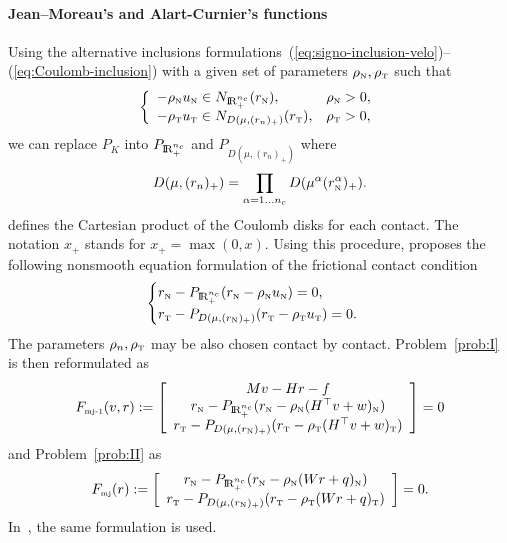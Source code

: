 \paragraph{Jean--Moreau's and Alart-Curnier's functions}

Using the alternative inclusions formulations~(\ref{eq:signo-inclusion-velo})--(\ref{eq:Coulomb-inclusion}) with a given set of parameters $\rho_{\hbox{\tiny{N}}},\rho_{\hbox{\tiny{T}}}$ such that
\begin{equation} 
  \label{eq:inclusion-rhorho}
  \left\{ \begin{array}{ll}
    -\rho_\n u_\n \in N_{\RR^{n_c}_+}(r_\n), & \rho_\n>0, \\
    -\rho_\t u_{\t} \in N_{D(\mu,(r_{n})_+)}(r_\t), & \rho_\t>0,
  \end{array}\right.
\end{equation}
 we can replace $P_K$ into $P_{\mathrm{I\!R}^{n_c}_+}$ and $P_{D(\mu,(r_{n})_+)}$ where 
\begin{equation}
  \label{eq:diskR-prod}
  D(\mu,(r_{n})_+) = \prod_{\alpha=1\ldots n_c} D(\mu^{\alpha} (r_{\n}^\alpha)_+).
\end{equation}
defines the Cartesian product of the Coulomb disks for each contact. The notation $x_+$ stands for $x_+ = \max(0,x)$. Using this procedure, \citet{Jean.Moreau1987} proposes the following nonsmooth equation formulation of the frictional contact condition
\begin{equation}
  \label{eq:Moreau--Jean-1}
    \begin{cases}
    r_\n - P_{\RR^{n_c}_+}(r_\n - \rho_\n  u_\n) = 0, \\
    r_\t - P_{D(\mu, (r_{\n})_+)}(r_\t - \rho_\t u_\t   )=0.
  \end{cases}
\end{equation}
The parameters $\rho_n,\rho_{\hbox{\tiny{T}}}$ may be also chosen contact by contact. Problem~\ref{prob:I} is then reformulated as
\begin{equation}
  \label{eq:MJ-I}
  F_{\mjone}(v,r) := \left[
    \begin{array}{c}
    Mv - Hr - f \\
    r_\n - P_{\RR^{n_c}_+}(r_\n - \rho_\n (H^\top v + w)_\n) \\
    r_\t - P_{D(\mu, (r_{\n})_+)}(r_\t - \rho_\t (H^\top v + w)_\t   ) 
  \end{array}\right] =0
\end{equation}
and  Problem~\ref{prob:II}  as
\begin{equation}
  \label{eq:MJ-II}
    F_{\mjtwo}(r) := \left[ \begin{array}{c}
    r_\n - P_{\RR^{n_c}_+}(r_\n - \rho_\n (W r +  q)_\n) \\
    r_\t - P_{D(\mu, (r_{\n})_+)}(r_\t - \rho_\t (Wr+q)_\t   ) 
  \end{array}\right] =0.
\end{equation}
In~\cite{Christensen.Klarbring.ea1998}, the same formulation is used.

